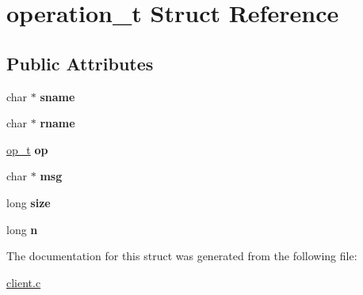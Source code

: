 \hypertarget{structoperation__t}{}\section{operation\+\_\+t Struct Reference}
\label{structoperation__t}
\subsection*{Public Attributes}
\begin{DoxyCompactItemize}
\item 
\mbox{\label{structoperation__t_a7822f225cfc9123dab423ba683c1aace}} 
char $\ast$ {\bfseries sname}
\item 
\mbox{\label{structoperation__t_a6889a2b00ba2ad2d34666eea3d59e736}} 
char $\ast$ {\bfseries rname}
\item 
\mbox{\label{structoperation__t_afa66e43cb50d2792e12f7a2b054bc396}} 
\hyperlink{ops_8h_ac6fa1b34da8872e34c2936391332f44c}{op\+\_\+t} {\bfseries op}
\item 
\mbox{\label{structoperation__t_a3034fb2b256feb05ef6d4d034cb17265}} 
char $\ast$ {\bfseries msg}
\item 
\mbox{\label{structoperation__t_a453c2473442f61fbc268d30c8ebb4338}} 
long {\bfseries size}
\item 
\mbox{\label{structoperation__t_aa18a74143d24d04171d8b8206ae9d15b}} 
long {\bfseries n}
\end{DoxyCompactItemize}


The documentation for this struct was generated from the following file\+:\begin{DoxyCompactItemize}
\item 
\hyperlink{client_8c}{client.\+c}\end{DoxyCompactItemize}

